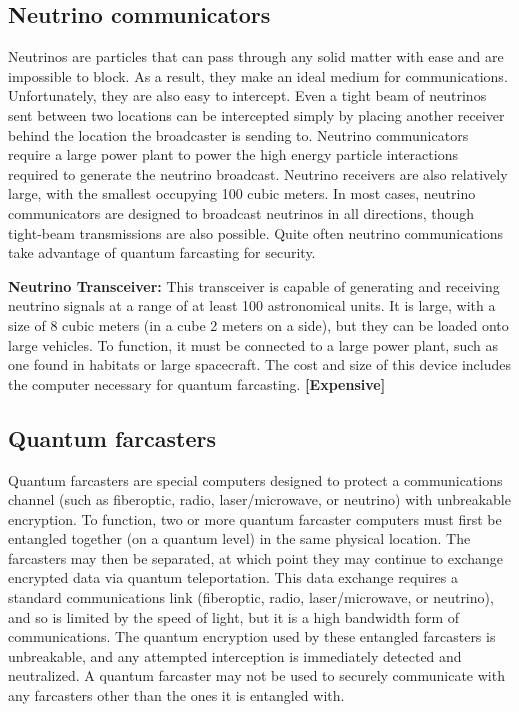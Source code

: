 \subsection{Neutrino communicators} \label{sec:neutrino-communicators} 

Neutrinos are particles that can pass through any solid matter with ease and are impossible to block. As a result, they make an ideal medium for communications. Unfortunately, they are also easy to intercept. Even a tight beam of neutrinos sent between two locations can be intercepted simply by placing another receiver behind the location the broadcaster is sending to. Neutrino communicators require a large power plant to power the high energy particle interactions required to generate the neutrino broadcast. Neutrino receivers are also relatively large, with the smallest occupying 100 cubic meters. In most cases, neutrino communicators are designed to broadcast neutrinos in all directions, though tight-beam transmissions are also possible. Quite often neutrino communications take advantage of quantum farcasting for security. 

\textbf{Neutrino Transceiver:} This transceiver is capable of generating and receiving neutrino signals at a range of at least 100 astronomical units. It is large, with a size of 8 cubic meters (in a cube 2 meters on a side), but they can be loaded onto large vehicles. To function, it must be connected to a large power plant, such as one found in habitats or large spacecraft. The cost and size of this device includes the computer necessary for quantum farcasting. \textbf{[Expensive]} 

\subsection{Quantum farcasters} \label{sec:quantum-farcasters} 

Quantum farcasters are special computers designed to protect a communications channel (such as fiberoptic, radio, laser/microwave, or neutrino) with unbreakable encryption. To function, two or more quantum farcaster computers must first be entangled together (on a quantum level) in the same physical location. The farcasters may then be separated, at which point they may continue to exchange encrypted data via quantum teleportation. This data exchange requires a standard communications link (fiberoptic, radio, laser/microwave, or neutrino), and so is limited by the speed of light, but it is a high bandwidth form of communications. The quantum encryption used by these entangled farcasters is unbreakable, and any attempted interception is immediately detected and neutralized. A quantum farcaster may not be used to securely communicate with any farcasters other than the ones it is entangled with. 

